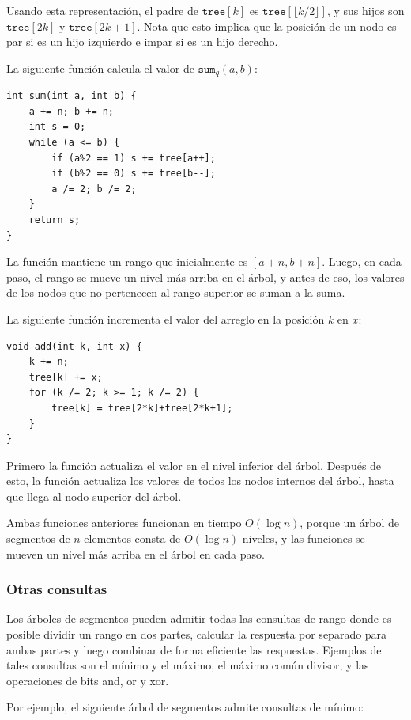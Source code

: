 Usando esta representación,
el padre de $\texttt{tree}[k]$
es $\texttt{tree}[\lfloor k/2 \rfloor]$,
y sus hijos son $\texttt{tree}[2k]$
y $\texttt{tree}[2k+1]$.
Nota que esto implica que la posición de un nodo
es par si es un hijo izquierdo e impar si es un hijo derecho.

La siguiente función
calcula el valor de $\texttt{sum}_q(a,b)$:
\begin{lstlisting}
int sum(int a, int b) {
    a += n; b += n;
    int s = 0;
    while (a <= b) {
        if (a%2 == 1) s += tree[a++];
        if (b%2 == 0) s += tree[b--];
        a /= 2; b /= 2;
    }
    return s;
}
\end{lstlisting}
La función mantiene un rango
que inicialmente es $[a+n,b+n]$.
Luego, en cada paso, el rango se mueve
un nivel más arriba en el árbol,
y antes de eso, los valores de los nodos que no
pertenecen al rango superior se suman a la suma.

La siguiente función incrementa el valor del arreglo
en la posición $k$ en $x$:
\begin{lstlisting}
void add(int k, int x) {
    k += n;
    tree[k] += x;
    for (k /= 2; k >= 1; k /= 2) {
        tree[k] = tree[2*k]+tree[2*k+1];
    }
}
\end{lstlisting}
Primero la función actualiza el valor
en el nivel inferior del árbol.
Después de esto, la función actualiza los valores de todos
los nodos internos del árbol, hasta que llega
al nodo superior del árbol.

Ambas funciones anteriores funcionan
en tiempo $O(\log n)$, porque un árbol de segmentos
de $n$ elementos consta de $O(\log n)$ niveles,
y las funciones se mueven un nivel más arriba
en el árbol en cada paso.

\subsubsection{Otras consultas}

Los árboles de segmentos pueden admitir todas las consultas de rango
donde es posible dividir un rango en dos partes,
calcular la respuesta por separado para ambas partes
y luego combinar de forma eficiente las respuestas.
Ejemplos de tales consultas son
el mínimo y el máximo, el máximo común divisor,
y las operaciones de bits and, or y xor.

Por ejemplo, el siguiente árbol de segmentos
admite consultas de mínimo:

